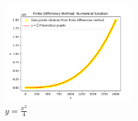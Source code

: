 \documentclass[journal]{IEEEtran}
\begin{document}
\begin{figure}[h]  %
  \centering  %
  \includegraphics[width=0.5\textwidth]{figs/de1.png}  
  \caption{$y=\frac{x^3}{4}$}
  \label{fig:example}  %
\end{figure}
\end{document}

